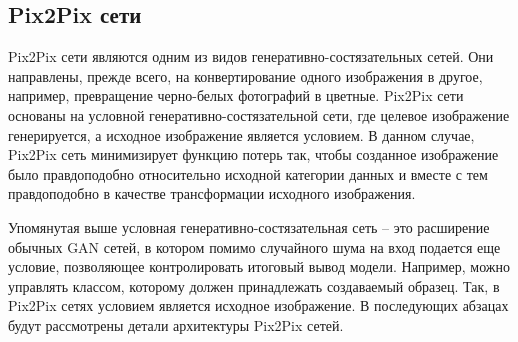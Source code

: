 \subsection{Pix2Pix сети}
Pix2Pix сети являются одним из видов генеративно-состязательных сетей. Они направлены, прежде всего, на конвертирование одного изображения в другое\cite{pix2pix-overview}, например, превращение черно-белых фотографий в цветные. Pix2Pix сети основаны на условной генеративно-состязательной сети, где целевое изображение генерируется, а исходное изображение является условием\cite[с.~455]{jason-brownlee-gan}. В данном случае, Pix2Pix сеть минимизирует функцию потерь так, чтобы созданное изображение было правдоподобно относительно исходной категории данных и вместе с тем правдоподобно в качестве трансформации исходного изображения.

Упомянутая выше условная генеративно-состязательная сеть -- это расширение обычных GAN сетей, в котором помимо случайного шума на вход подается еще условие, позволяющее контролировать итоговый вывод модели\cite{gan-conditional}. Например, можно управлять классом, которому должен принадлежать создаваемый образец. Так, в Pix2Pix сетях условием является исходное изображение. В последующих абзацах будут рассмотрены детали архитектуры Pix2Pix сетей.